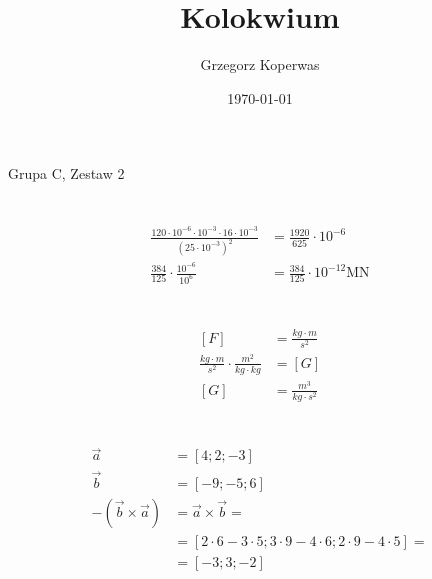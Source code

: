 \documentclass[a4paper,12pt]{article}
\title{Kolokwium}
\author{Grzegorz Koperwas}
\date{\today}
\begin{document}
\maketitle

Grupa C, Zestaw 2

\section{}
\begin{align*}
    \frac{120 \cdot 10^{-6} \cdot 10^{-3} \cdot 16 \cdot 10^{-3}}{\left(25 \cdot 10^{-3}\right)^2} &= \frac{1920}{625} \cdot 10^{-6} \\
    \frac{384}{125} \cdot \frac{10^{-6}}{10^6} &= \frac{384}{125} \cdot 10^{-12} \text{MN}
\end{align*}
\section{}
\begin{align*}
    \left[F \right] &= \frac{kg \cdot m}{s^2} \\
    \frac{kg \cdot m}{s^2} \cdot \frac{m^2}{kg \cdot kg} &= \left[G\right] \\
    \left[G\right] &= \frac{m^3}{kg \cdot s^2}
\end{align*}
\section{}
\begin{align*}
    \vec{a} &= \left[4; 2; -3\right]\\
    \vec{b} &= \left[-9; -5; 6\right]\\
    - \left(\vec{b} \times \vec{a}\right) &= \vec{a} \times \vec{b} = \\
    &= \left[2 \cdot 6 - 3 \cdot 5; 3 \cdot 9 - 4 \cdot 6; 2 \cdot 9 - 4 \cdot 5\right] = \\
    &= \left[-3; 3; -2\right]
\end{align*}
\end{document}

